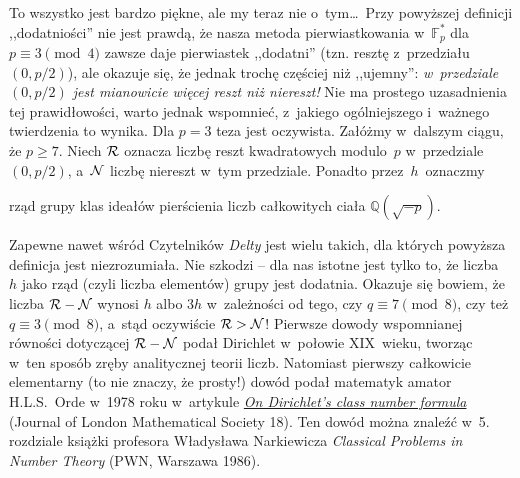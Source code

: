 To wszystko jest bardzo piękne, ale my teraz nie o~tym\dots\ Przy powyższej
definicji  ,,dodatniości''  nie jest prawdą, że nasza metoda
pierwiastkowania w~$\mathbb F_p^{\ast}$ dla ${p\equiv 3\pmod{4}}$ zawsze daje
pierwiastek ,,dodatni'' (tzn. resztę z~przedziału~$(0,p/2)$), ale okazuje się,
że jednak trochę częściej  niż ,,ujemny'': {\it w~przedziale $(0,p/2)$ jest
mianowicie więcej reszt niż niereszt! } Nie ma prostego uzasadnienia tej
prawidłowości, warto jednak wspomnieć, z~jakiego
ogólniejszego i~ważnego twierdzenia to wynika. Dla $p=3$ teza jest oczywista. Załóżmy w~dalszym ciągu, że $p\geq 7$. Niech $\cal R$ oznacza liczbę reszt kwadratowych
modulo~$p$ w~przedziale $(0,p/2)$, a~$\cal N$ liczbę niereszt w~tym przedziale.
Ponadto przez~$h$~oznaczmy
\begin{center}
\vspace*{-.1cm}
\color{magenta}rząd grupy klas ideałów pierścienia liczb całkowitych ciała
$\mathbb Q(\sqrt{-p})$.
\vspace*{-.1cm}
\end{center}
Zapewne nawet wśród Czytelników \textit{Delty} jest wielu takich, dla których
powyższa definicja jest niezrozumiała. Nie szkodzi -- dla nas istotne jest tylko
to, że liczba~$h$ jako rząd (czyli liczba elementów) grupy jest dodatnia.
Okazuje się bowiem, że liczba ${\cal R}-{\cal N}$ wynosi $h$ albo $3h$ w~zależności od
tego, czy $q\equiv 7\pmod{8}$, czy też  $q\equiv 3\pmod{8}$, a~stąd oczywiście ${\cal R}>{\cal N}$! Pierwsze
dowody wspomnianej równości dotyczącej $\cal R-\cal N$
podał Dirichlet
w~połowie XIX~wieku, tworząc w~ten sposób zręby analitycznej teorii liczb.
Natomiast pierwszy całkowicie elementarny (to nie znaczy, że prosty!) dowód
podał matematyk amator H.L.S.~Orde w~1978 roku w~artykule \href{https://mathoverflow.net/questions/25263/most-squares-in-the-first-half-interval}{\textit{On
Dirichlet's class number formula}} (Journal of London Mathematical Society 18). 
Ten dowód można
znaleźć w~5. rozdziale książki profesora Władysława Narkiewicza \textit{Classical
Problems in
Number Theory} (PWN, Warszawa 1986).
\eject

\normalsize




